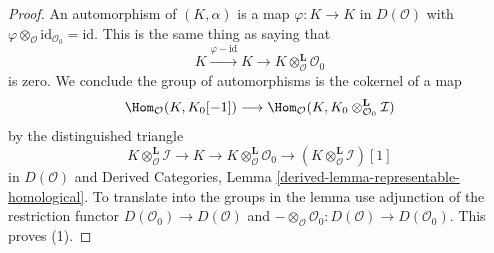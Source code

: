 \begin{proof}

An automorphism of $(K, \alpha)$ is a map $\varphi : K \to K$
in $D(\mathcal{O})$ with
$\varphi \otimes_\mathcal{O} \text{id}_{\mathcal{O}_0} = \text{id}$.
This is the same thing as saying that
$$
K \xrightarrow{\varphi - \text{id}} K \to
K \otimes_\mathcal{O}^\mathbf{L} \mathcal{O}_0
$$
is zero. We conclude the group of automorphisms is
the cokernel of a map
$$
\Hom_\mathcal{O}(K, K_0[-1])
\longrightarrow
\Hom_\mathcal{O}(K, K_0 \otimes_{\mathcal{O}_0}^\mathbf{L} \mathcal{I})
$$
by the distinguished triangle
$$
K \otimes_\mathcal{O}^\mathbf{L} \mathcal{I} \to
K \to
K \otimes_\mathcal{O}^\mathbf{L} \mathcal{O}_0 \to
(K \otimes_\mathcal{O}^\mathbf{L} \mathcal{I})[1]
$$
in $D(\mathcal{O})$ and
Derived Categories, Lemma \ref{derived-lemma-representable-homological}.
To translate into the groups in the lemma use adjunction
of the restriction functor $D(\mathcal{O}_0) \to D(\mathcal{O})$ and
$- \otimes_\mathcal{O} \mathcal{O}_0 : D(\mathcal{O}) \to D(\mathcal{O}_0)$.
This proves (1).


\end{proof}
